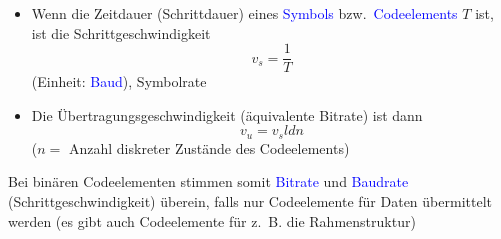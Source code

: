 \begin{itemize}
    \item Wenn die Zeitdauer (Schrittdauer) eines \textcolor{blue}{Symbols} bzw.\ \textcolor{blue}{Codeelements} $T$ ist,
    ist die Schrittgeschwindigkeit \[v_s = \frac{1}{T}\] (Einheit: \textcolor{blue}{Baud}), Symbolrate
    \item Die Übertragungsgeschwindigkeit (äquivalente Bitrate) ist dann \[v_u = v_s ld n\] ($n=$ Anzahl diskreter Zustände des Codeelements)
\end{itemize}
Bei binären Codeelementen stimmen somit \textcolor{blue}{Bitrate} und \textcolor{blue}{Baudrate} (Schrittgeschwindigkeit) überein, falls nur Codeelemente für Daten übermittelt werden (es gibt auch Codeelemente für z.\ B. die Rahmenstruktur)


